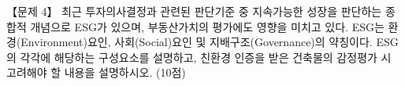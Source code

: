 \begin{longquestion}{【문제 4】}
최근 투자의사결정과 관련된 판단기준 중 지속가능한 성장을 판단하는 종합적 개념으로 ESG가 있으며, 부동산가치의 평가에도 영향을 미치고 있다. ESG는 환경(Environment)요인, 사회(Social)요인 및 지배구조(Governance)의 약칭이다. ESG의 각각에 해당하는 구성요소를 설명하고, 친환경 인증을 받은 건축물의 감정평가 시 고려해야 할 내용을 설명하시오. (10점) \par
\end{longquestion}

